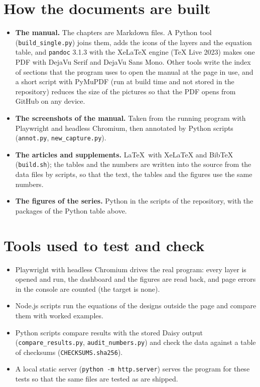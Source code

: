 \section{How the documents are built}
\begin{itemize}[nosep,leftmargin=1.2em]
\item \textbf{The manual.} The chapters are Markdown files. A Python tool (\texttt{build\_single.py}) joins them, adds the icons of the layers and the equation table, and \texttt{pandoc} 3.1.3 with the XeLaTeX engine (TeX Live 2023) makes one PDF with DejaVu Serif and DejaVu Sans Mono. Other tools write the index of sections that the program uses to open the manual at the page in use, and a short script with PyMuPDF (run at build time and not stored in the repository) reduces the size of the pictures so that the PDF opens from GitHub on any device.
\item \textbf{The screenshots of the manual.} Taken from the running program with Playwright and headless Chromium, then annotated by Python scripts (\texttt{annot.py}, \texttt{new\_capture.py}).
\item \textbf{The articles and supplements.} \LaTeX\ with XeLaTeX and BibTeX (\texttt{build.sh}); the tables and the numbers are written into the source from the data files by scripts, so that the text, the tables and the figures use the same numbers.
\item \textbf{The figures of the series.} Python in the scripts of the repository, with the packages of the Python table above.
\end{itemize}

\section{Tools used to test and check}
\begin{itemize}[nosep,leftmargin=1.2em]
\item Playwright with headless Chromium drives the real program: every layer is opened and run, the dashboard and the figures are read back, and page errors in the console are counted (the target is none).
\item Node.js scripts run the equations of the designs outside the page and compare them with worked examples.
\item Python scripts compare results with the stored Daisy output (\texttt{compare\_results.py}, \texttt{audit\_numbers.py}) and check the data against a table of checksums (\texttt{CHECKSUMS.sha256}).
\item A local static server (\texttt{python -m http.server}) serves the program for these tests so that the same files are tested as are shipped.
\end{itemize}


